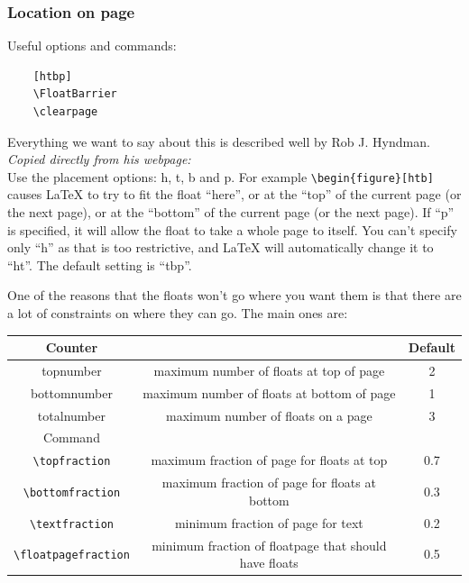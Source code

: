 \documentclass[main_brownies.tex]{subfiles}
\begin{document}
\subsubsection{Location on page}
Useful options and commands:
\begin{Verbatim}
	[htbp]
	\FloatBarrier
	\clearpage
\end{Verbatim}
Everything we want to say about this is described well by Rob J. Hyndman.\cite{Hyndsight}\\

\noindent\dotfill\textit{Copied directly from his webpage:}\dotfill\\
Use the placement options: h, t, b and p. For example \verb*|\begin{figure}[htb]| causes LaTeX to try to fit the float “here”, or at the “top” of the current page (or the next page), or at the “bottom” of the current page (or the next page). If “p” is specified, it will allow the float to take a whole page to itself. You can’t specify only “h” as that is too restrictive, and LaTeX will automatically change it to “ht”. The default setting is “tbp”.
	
One of the reasons that the floats won’t go where you want them is that there are a lot of constraints on where they can go. The main ones are:

\begin{adjustbox}{width=1\textwidth}
	\begin{tabular}{ccc}
		\hline
		Counter&&Default\\
		\hline
		topnumber&maximum number of floats at top of page&2\\
		bottomnumber&maximum number of floats at bottom of page&1\\
		totalnumber&maximum number of floats on a page&3\\
		\hline
		Command&&\\
		\hline
		\verb*|\topfraction|&maximum fraction of page for floats at top&0.7\\
		\verb*|\bottomfraction|&maximum fraction of page for floats at bottom&0.3\\
		\verb*|\textfraction|&minimum fraction of page for text&0.2\\
		\verb*|\floatpagefraction|&minimum fraction of floatpage that should have floats&0.5\\
		\hline
	\end{tabular}
\end{adjustbox}
\end{document}
